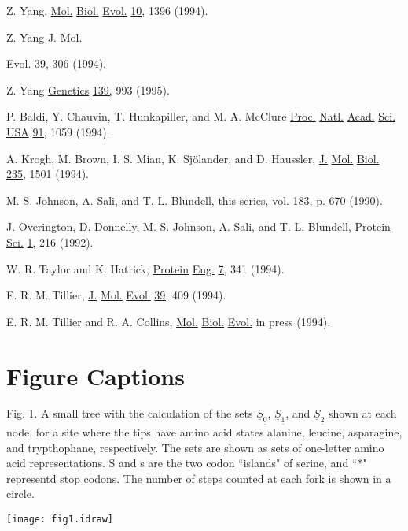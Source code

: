 \documentclass[12pt]{article}
\def\ul{\underline}
\begin{document}
\begin{enumerate}
{\item Z. Yang, \ul{Mol.} \ul{Biol.} \ul{Evol.}  \ul{10,} 1396 (1994).

\item Z. Yang \ul{J.} \ul Mol.} \ul{Evol.} \ul{39,} 306  (1994).

\item Z. Yang \ul{Genetics} \ul{139,} 993 (1995).

\item P. Baldi, Y. Chauvin, T. Hunkapiller, and M. A. McClure \ul{Proc.} \ul{Natl.} \ul{Acad.} \ul{Sci.} \ul{USA}  \ul{91,}  1059 (1994). 

\item A. Krogh, M. Brown, I. S. Mian, K. Sj\"olander, and D. Haussler, \ul{J.} 
\ul{Mol.} \ul{Biol.} \ul{235,} 1501 (1994).

\item M. S. Johnson, A. Sali, and T. L. Blundell, this series, vol. 183, p. 670 (1990).

\item J. Overington, D. Donnelly, M. S. Johnson, A. Sali, and T. L. Blundell,
\ul{Protein} \ul{Sci.}  \ul{1,}  216 (1992).

\item W. R. Taylor and K. Hatrick, \ul{Protein} \ul{Eng.} \ul{7,}  341 (1994).

\item E. R. M. Tillier, \ul{J.} \ul{Mol.} \ul{Evol.}  \ul{39,} 409 (1994).

\item E. R. M. Tillier and R. A. Collins, \ul{Mol.} \ul{Biol.} \ul{Evol.} in press (1994).

\end{enumerate}

\newpage

\section*{Figure Captions}

{\sc Fig. 1.} A small tree with the calculation of the sets $\ul{S}_{\ul{0}}$, $\ul{S}_{\ul{1}}$, and
$\ul{S}_{\ul{2}}$ shown at each node, for a site where the tips have amino acid
states alanine, leucine, asparagine, and trypthophane, respectively.  The sets are
shown as sets of one-letter amino acid representations.  S and s are the two
codon ``islands" of serine, and ``*" representd stop codons.  The number of steps
counted at each fork is shown in a circle.

\newpage

\centerline{\texttt{[image: fig1.idraw]}}
\end{document}
